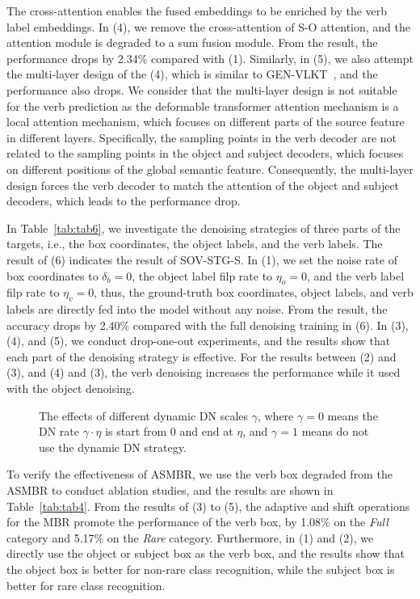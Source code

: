 \documentclass[10pt,twocolumn,letterpaper]{article}
\begin{document}
The cross-attention enables the fused embeddings to be enriched by the verb label embeddings.
In (4), we remove the cross-attention of S-O attention, and the attention module is degraded to a sum fusion module.
From the result, the performance drops by 2.34\% compared with (1).
Similarly, in (5), we also attempt the multi-layer design of the (4), which is similar to GEN-VLKT~\cite{liao2022gen}, and the performance also drops.
We consider that the multi-layer design is not suitable for the verb prediction as the deformable transformer attention mechanism is a local attention mechanism, which focuses on different parts of the source feature in different layers.
Specifically, the sampling points in the verb decoder are not related to the sampling points in the object and subject decoders, which focuses on different positions of the global semantic feature.
Consequently, the multi-layer design forces the verb decoder to match the attention of the object and subject decoders, which leads to the performance drop.

\quad In Table~\ref{tab:tab6}, we investigate the denoising strategies of three parts of the targets, i.e., the box coordinates, the object labels, and the verb labels.
The result of (6) indicates the result of SOV-STG-S.
In (1), we set the noise rate of box coordinates to $\delta_b=0$, the object label filp rate to $\eta_o=0$, and the verb label filp rate to $\eta_v=0$, thus, the ground-truth box coordinates, object labels, and verb labels are directly fed into the model without any noise.
From the result, the accuracy drops by 2.40\% compared with the full denoising training in (6).
In (3), (4), and (5), we conduct drop-one-out experiments, and the results show that each part of the denoising strategy is effective.
For the results between (2) and (3), and (4) and (3), the verb denoising increases the performance while it used with the object denoising.

\begin{figure}[!t]
  \centering
  \caption{The effects of different dynamic DN scales $\gamma$, where $\gamma=0$ means the DN rate $\gamma\cdot \eta$ is start from 0 and end at $\eta$, and $\gamma=1$ means do not use the dynamic DN strategy.}
  \label{fig:dynamic_noise_scale}
\end{figure}

\quad To verify the effectiveness of ASMBR, we use the verb box degraded from the ASMBR to conduct ablation studies, and the results are shown in Table~\ref{tab:tab4}.
From the results of (3) to (5), the adaptive and shift operations for the MBR promote the performance of the verb box, by 1.08\% on the \textit{Full} category and 5.17\% on the \textit{Rare} category.
Furthermore, in (1) and (2), we directly use the object or subject box as the verb box, and the results show that the object box is better for non-rare class recognition, while the subject box is better for rare class recognition.
\end{document}
